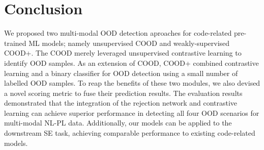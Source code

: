 \section{Conclusion}\label{sec:conclusion} 
We proposed two multi-modal OOD detection aproaches for code-related pre-trained ML models; namely unsupervised COOD and weakly-supervised COOD+. The COOD merely leveraged unsupervised contrastive learning to identify OOD samples. As an extension of COOD, COOD+ combined contrastive learning and a binary classifier for OOD detection using a small number of labelled OOD samples. To reap the benefits of these two modules, we also devised a novel scoring metric to fuse their prediction results. The evaluation results demonstrated that the integration of the rejection network and contrastive learning can achieve superior performance in detecting all four OOD scenarios for multi-modal NL-PL data. Additionally, our models can be applied to the downstream SE task, achieving comparable performance to existing code-related models. %

